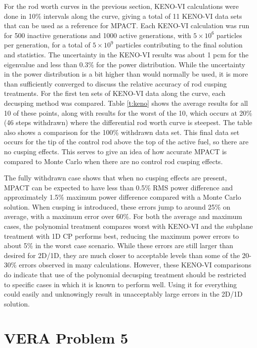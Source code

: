 For the rod worth curves in the previous section, KENO-VI calculations were done in 10\% intervals along the curve, giving a total of 11 KENO-VI data sets that can be used as a reference for MPACT.  Each KENO-VI calculation was run for 500 inactive generations and 1000 active generations, with $5\times 10^6$ particles per generation, for a total of $5\times 10^9$ particles contributing to the final solution and statistics.  The uncertainty in the KENO-VI results was about 1 pcm for the eigenvalue and less than 0.3\% for the power distribution.  While the uncertainty in the power distribution is a bit higher than would normally be used, it is more than sufficiently converged to discuss the relative accuracy of rod cusping treatments.  For the first ten sets of KENO-VI data along the curve, each decusping method was compared.  Table \ref{t:keno} shows the average results for all 10 of these points, along with results for the worst of the 10, which occurs at 20\% (46 steps withdrawn) where the differential rod worth curve is steepest.  The table also shows a comparison for the 100\% withdrawn data set.  This final data set occurs for the tip of the control rod above the top of the active fuel, so there are no cusping effects.  This serves to give an idea of how accurate MPACT is compared to Monte Carlo when there are no control rod cusping effects.

The fully withdrawn case shows that when no cusping effects are present, MPACT can be expected to have less than 0.5\% RMS power difference and approximately 1.5\% maximum power difference compared with a Monte Carlo solution.  When cusping is introduced, these errors jump to around 25\% on average, with a maximum error over 60\%.  For both the average and maximum cases, the polynomial treatment compares worst with KENO-VI and the subplane treatment with 1D CP performs best, reducing the maximum power errors to about 5\% in the worst case scenario.  While these errors are still larger than desired for 2D/1D, they are much closer to acceptable levels than some of the 20-30\% errors observed in many calculations.  However, these KENO-VI comparisons do indicate that use of the polynomial decusping treatment should be restricted to specific cases in which it is known to perform well.  Using it for everything could easily and unknowingly result in unacceptably large errors in the 2D/1D solution.

\section{VERA Problem 5}

